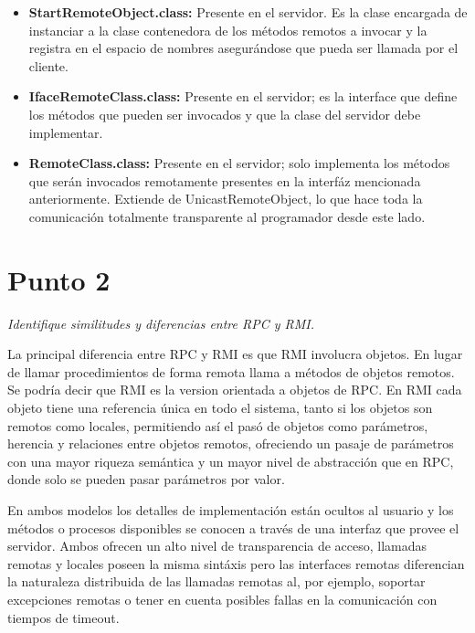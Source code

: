 \documentclass[12pt,journal,compsoc]{IEEEtran}
\begin{document}
\begin{enumerate}[label=\alph* -]
\begin{itemize}
    \item \textbf{StartRemoteObject.class:} Presente en el servidor.
    Es la clase encargada de instanciar a la clase contenedora de los
    métodos remotos a invocar y la registra en el espacio de nombres
    asegurándose que pueda ser llamada por el cliente.\\

    \item \textbf{IfaceRemoteClass.class:} Presente en el servidor;
    es la interface que define los métodos que pueden ser invocados y
    que la clase del servidor debe implementar.\\

    \item \textbf{RemoteClass.class:} Presente en el servidor;
    solo implementa los métodos que serán invocados remotamente
    presentes en la interfáz mencionada anteriormente. Extiende de
    UnicastRemoteObject, lo que hace toda la comunicación totalmente
    transparente al programador desde este lado.\\
  \end{itemize}
\end{enumerate}

\section{Punto 2}
\textit{Identifique similitudes y diferencias entre RPC y RMI.}

La principal diferencia entre RPC y RMI es que RMI involucra objetos.
En lugar de llamar procedimientos de forma remota llama a métodos de
objetos remotos. Se podría decir que RMI es la version orientada a objetos
de RPC.  En RMI cada objeto tiene una referencia única en todo el sistema,
tanto si los objetos son remotos como locales, permitiendo así el pasó de
objetos como parámetros, herencia y relaciones entre objetos remotos,
ofreciendo un pasaje de parámetros con una mayor riqueza semántica y un
mayor nivel de abstracción que en RPC, donde solo se pueden pasar
parámetros por valor.

En ambos modelos los detalles de implementación están ocultos al usuario
y los métodos o procesos disponibles se conocen a través de una interfaz
que provee el servidor.
Ambos ofrecen un alto nivel de transparencia de acceso, llamadas remotas
y locales poseen la misma sintáxis pero las interfaces remotas
diferencian la naturaleza distribuida de las llamadas remotas al, por
ejemplo, soportar excepciones remotas o tener en cuenta posibles fallas
en la comunicación con tiempos de timeout.
\end{document}
